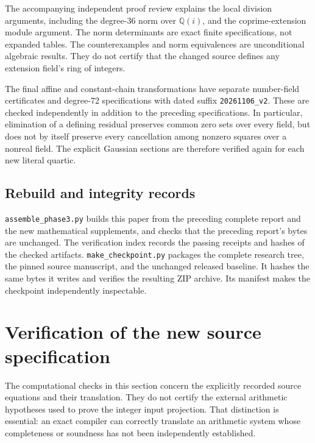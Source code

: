 \documentclass[11pt]{article}
\theoremstyle{definition}
\begin{document}
The accompanying independent proof review explains the local
division arguments, including the degree-36 norm over
$\mathbb Q(i)$, and the coprime-extension module argument. The norm
determinants are exact finite specifications, not expanded tables.
The counterexamples and norm equivalences are unconditional algebraic
results. They do not certify that the changed source defines any
extension field's ring of integers.

The final affine and constant-chain transformations have separate
number-field certificates and degree-72 specifications with dated
suffix \nolinkurl{20261106_v2}. These are checked independently in
addition to the preceding specifications. In particular, elimination of
a defining residual preserves common zero sets over every field, but
does not by itself preserve every cancellation among nonzero squares
over a nonreal field. The explicit Gaussian sections are therefore
verified again for each new literal quartic.

\subsection{Rebuild and integrity records}

\nolinkurl{assemble_phase3.py} builds this paper from the preceding
complete report and the new mathematical supplements, and checks that
the preceding report's bytes are unchanged. The verification index
records the passing receipts and hashes of the checked artifacts.
\nolinkurl{make_checkpoint.py} packages the complete research tree,
the pinned source manuscript, and the unchanged released baseline.
It hashes the same bytes it writes and verifies the resulting ZIP
archive. Its manifest makes the checkpoint independently inspectable.



\section{Verification of the new source specification}
\label{sec:direct-source-review}

The computational checks in this section concern the explicitly
recorded source equations and their translation.  They do not certify
the external arithmetic hypotheses used to prove the integer input
projection.  That distinction is essential: an exact compiler can
correctly translate an arithmetic system whose completeness or soundness
has not been independently established.
\end{document}
